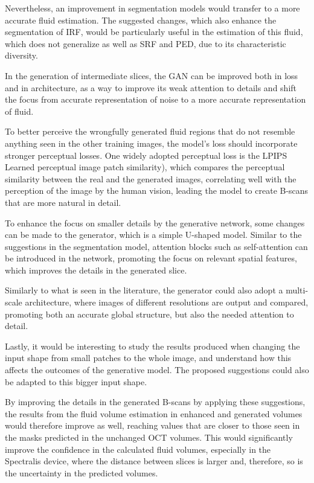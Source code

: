 \par
Nevertheless, an improvement in segmentation models would transfer to a more accurate fluid estimation. The suggested changes, which also enhance the segmentation of IRF, would be particularly useful in the estimation of this fluid, which does not generalize as well as SRF and PED, due to its characteristic diversity.
\par
In the generation of intermediate slices, the GAN can be improved both in loss and in architecture, as a way to improve its weak attention to details and shift the focus from accurate representation of noise to a more accurate representation of fluid.
\par
To better perceive the wrongfully generated fluid regions that do not resemble anything seen in the other training images, the model's loss should incorporate stronger perceptual losses. One widely adopted perceptual loss is the LPIPS Learned perceptual image patch similarity), which compares the perceptual similarity between the real and the generated images, correlating well with the perception of the image by the human vision, leading the model to create B-scans that are more natural in detail. 
\par
To enhance the focus on smaller details by the generative network, some changes can be made to the generator, which is a simple U-shaped model. Similar to the suggestions in the segmentation model, attention blocks such as self-attention can be introduced in the network, promoting the focus on relevant spatial features, which improves the details in the generated slice.
\par
Similarly to what is seen in the literature, the generator could also adopt a multi-scale architecture, where images of different resolutions are output and compared, promoting both an accurate global structure, but also the needed attention to detail.
\par
Lastly, it would be interesting to study the results produced when changing the input shape from small patches to the whole image, and understand how this affects the outcomes of the generative model. The proposed suggestions could also be adapted to this bigger input shape.
\par
By improving the details in the generated B-scans by applying these suggestions, the results from the fluid volume estimation in enhanced and generated volumes would therefore improve as well, reaching values that are closer to those seen in the masks predicted in the unchanged OCT volumes. This would significantly improve the confidence in the calculated fluid volumes, especially in the Spectralis device, where the distance between slices is larger and, therefore, so is the uncertainty in the predicted volumes.

